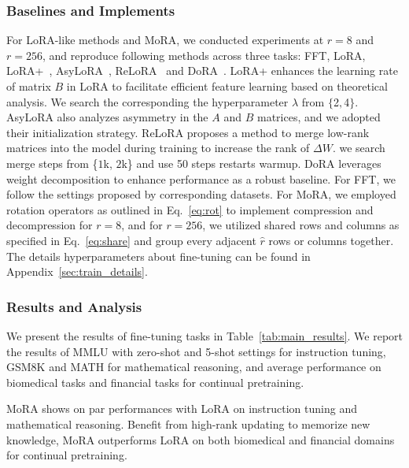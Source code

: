 \documentclass[11pt]{article}
\begin{document}
\subsubsection{Baselines and Implements}
For LoRA-like methods and MoRA, we conducted experiments at $r=8$ and $r=256$, and reproduce following methods across three tasks: FFT, LoRA, LoRA+~\cite{Hayou2024}, AsyLoRA~\cite{zhu2024asymmetry}, ReLoRA~\cite{lialin2023stack} and DoRA~\cite{liu2024dora}.
LoRA+ enhances the learning rate of matrix $B$ in LoRA to facilitate efficient feature learning based on theoretical analysis.
We search the corresponding the hyperparameter $\lambda$ from $\{$2$, $4$\}$.
AsyLoRA also analyzes asymmetry in the $A$ and $B$ matrices, and we adopted their initialization strategy.
ReLoRA proposes a method to merge low-rank matrices into the model during training to increase the rank of $\Delta W$.
we search merge steps from \{$1$k, $2$k\} and use 50 steps restarts warmup.
DoRA leverages weight decomposition to enhance performance as a robust baseline.
For FFT, we follow the settings proposed by corresponding datasets.
For MoRA, we employed rotation operators as outlined in Eq.~\ref{eq:rot} to implement compression and decompression for $r=8$, and for $r=256$, we utilized shared rows and columns as specified in Eq.~\ref{eq:share} and group every adjacent $\hat{r}$ rows or columns together.
The details hyperparameters about fine-tuning can be found in Appendix~\ref{sec:train_details}.

\subsubsection{Results and Analysis}
We present the results of fine-tuning tasks in Table~\ref{tab:main_results}.
We report the results of MMLU with zero-shot and 5-shot settings for instruction tuning, GSM8K and MATH for mathematical reasoning, and average performance on biomedical tasks and financial tasks for continual pretraining.


MoRA shows on par performances with LoRA on instruction tuning and mathematical reasoning.
Benefit from high-rank updating to memorize new knowledge, MoRA outperforms LoRA on both biomedical and financial domains for continual pretraining.
\end{document}
